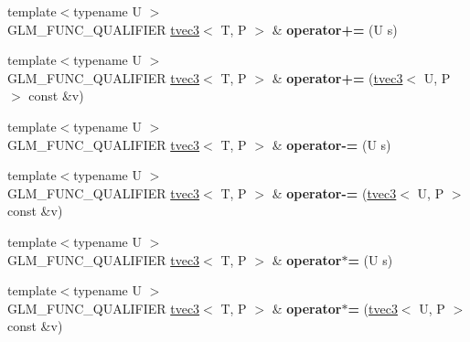 \begin{DoxyCompactItemize}
\item 
\hypertarget{structglm_1_1detail_1_1tvec3_aad607a9c90b9cadc7aa6c4ac048adcb7}{{\footnotesize template$<$typename U $>$ }\\G\-L\-M\-\_\-\-F\-U\-N\-C\-\_\-\-Q\-U\-A\-L\-I\-F\-I\-E\-R \hyperlink{structglm_1_1detail_1_1tvec3}{tvec3}$<$ T, P $>$ \& {\bfseries operator+=} (U s)}\label{structglm_1_1detail_1_1tvec3_aad607a9c90b9cadc7aa6c4ac048adcb7}

\item 
\hypertarget{structglm_1_1detail_1_1tvec3_af459080608fac7a3cf88684d44b10fc3}{{\footnotesize template$<$typename U $>$ }\\G\-L\-M\-\_\-\-F\-U\-N\-C\-\_\-\-Q\-U\-A\-L\-I\-F\-I\-E\-R \hyperlink{structglm_1_1detail_1_1tvec3}{tvec3}$<$ T, P $>$ \& {\bfseries operator+=} (\hyperlink{structglm_1_1detail_1_1tvec3}{tvec3}$<$ U, P $>$ const \&v)}\label{structglm_1_1detail_1_1tvec3_af459080608fac7a3cf88684d44b10fc3}

\item 
\hypertarget{structglm_1_1detail_1_1tvec3_aaffa97a8d1d5dd29ba438159fb60e0e9}{{\footnotesize template$<$typename U $>$ }\\G\-L\-M\-\_\-\-F\-U\-N\-C\-\_\-\-Q\-U\-A\-L\-I\-F\-I\-E\-R \hyperlink{structglm_1_1detail_1_1tvec3}{tvec3}$<$ T, P $>$ \& {\bfseries operator-\/=} (U s)}\label{structglm_1_1detail_1_1tvec3_aaffa97a8d1d5dd29ba438159fb60e0e9}

\item 
\hypertarget{structglm_1_1detail_1_1tvec3_a74d551954eaca6824359af0d741a17df}{{\footnotesize template$<$typename U $>$ }\\G\-L\-M\-\_\-\-F\-U\-N\-C\-\_\-\-Q\-U\-A\-L\-I\-F\-I\-E\-R \hyperlink{structglm_1_1detail_1_1tvec3}{tvec3}$<$ T, P $>$ \& {\bfseries operator-\/=} (\hyperlink{structglm_1_1detail_1_1tvec3}{tvec3}$<$ U, P $>$ const \&v)}\label{structglm_1_1detail_1_1tvec3_a74d551954eaca6824359af0d741a17df}

\item 
\hypertarget{structglm_1_1detail_1_1tvec3_a519058bf101092a6e09727980443a2bc}{{\footnotesize template$<$typename U $>$ }\\G\-L\-M\-\_\-\-F\-U\-N\-C\-\_\-\-Q\-U\-A\-L\-I\-F\-I\-E\-R \hyperlink{structglm_1_1detail_1_1tvec3}{tvec3}$<$ T, P $>$ \& {\bfseries operator$\ast$=} (U s)}\label{structglm_1_1detail_1_1tvec3_a519058bf101092a6e09727980443a2bc}

\item 
\hypertarget{structglm_1_1detail_1_1tvec3_a1d2ab1093230a4404781d65564e4f7d0}{{\footnotesize template$<$typename U $>$ }\\G\-L\-M\-\_\-\-F\-U\-N\-C\-\_\-\-Q\-U\-A\-L\-I\-F\-I\-E\-R \hyperlink{structglm_1_1detail_1_1tvec3}{tvec3}$<$ T, P $>$ \& {\bfseries operator$\ast$=} (\hyperlink{structglm_1_1detail_1_1tvec3}{tvec3}$<$ U, P $>$ const \&v)}\label{structglm_1_1detail_1_1tvec3_a1d2ab1093230a4404781d65564e4f7d0}


\end{DoxyCompactItemize}
